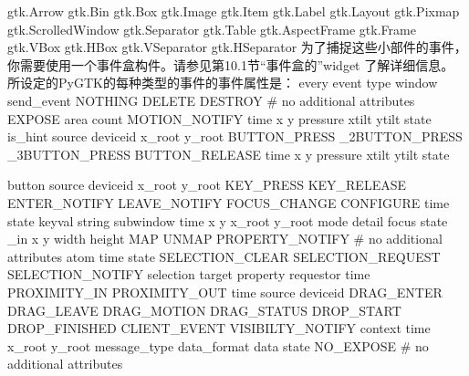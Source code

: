 gtk.Arrow
gtk.Bin
gtk.Box
gtk.Image
gtk.Item
gtk.Label
gtk.Layout
gtk.Pixmap
gtk.ScrolledWindow
gtk.Separator
gtk.Table
gtk.AspectFrame
gtk.Frame
gtk.VBox
gtk.HBox
gtk.VSeparator
gtk.HSeparator
为了捕捉这些小部件的事件，你需要使用一个事件盒构件。请参见第10.1节“事件盒的”widget
了解详细信息。
所设定的PyGTK的每种类型的事件的事件属性是：
every event
type
window
send_event
NOTHING
DELETE
DESTROY
# no additional attributes
EXPOSE area
      count
      MOTION_NOTIFY time
                   x
		               y
			                  pressure
					            xtilt
						             ytilt
							             state
								            is_hint
									          source
										       deviceid
										           x_root
											      y_root
											      BUTTON_PRESS
											      _2BUTTON_PRESS
											      _3BUTTON_PRESS
											      BUTTON_RELEASE
											      time
											      x
											      y
											      pressure
											      xtilt
											      ytilt
											      state

										button
										source
										deviceid
										x_root
										y_root
										KEY_PRESS
										KEY_RELEASE
										ENTER_NOTIFY
										LEAVE_NOTIFY
										FOCUS_CHANGE
										CONFIGURE
										time
										state
										keyval
										string
										subwindow
										time
										x
										y
										x_root
										y_root
										mode
										detail
										focus
										state
										_in
										x
										y
										width
										height
										MAP
										UNMAP
										PROPERTY_NOTIFY
										# no additional attributes
										atom
										time
										state
										SELECTION_CLEAR
										SELECTION_REQUEST
										SELECTION_NOTIFY
										selection
										target
										property
										requestor
										time
										PROXIMITY_IN
										PROXIMITY_OUT
										time
										source
										deviceid
										DRAG_ENTER
										DRAG_LEAVE
										DRAG_MOTION
DRAG_STATUS
DROP_START
DROP_FINISHED
CLIENT_EVENT
VISIBILTY_NOTIFY
context
time
x_root
y_root
message_type
data_format
data
state
NO_EXPOSE
# no additional attributes

